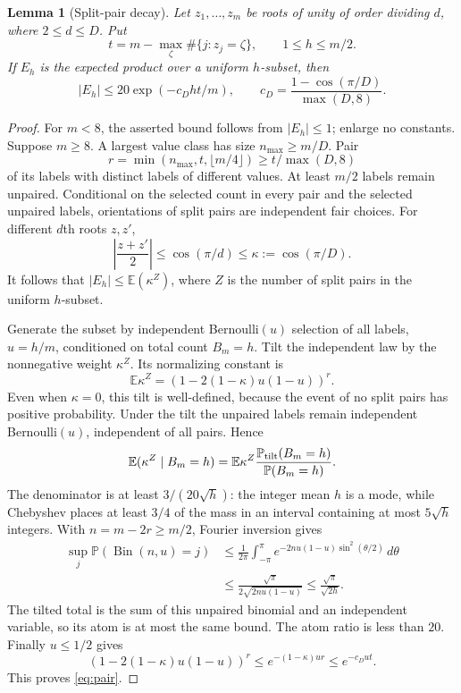 \documentclass[11pt]{article}
\newtheorem{lemma}[theorem]{Lemma}
\theoremstyle{remark}\newtheorem{remark}[theorem]{Remark}
\newcommand{\E}{\mathbb E}
\newcommand{\Pp}{\mathbb P}
\begin{document}
\begin{lemma}[Split-pair decay]\label{lem:pair}
Let $z_1,\ldots,z_m$ be roots of unity of order dividing $d$, where $2\le d\le D$. Put
\[
 t=m-\max_\zeta\#\{j:z_j=\zeta\},\qquad 1\le h\le m/2.
\]
If $E_h$ is the expected product over a uniform $h$-subset, then
\begin{equation}\label{eq:pair}
 |E_h|\le20\exp(-c_Dht/m),\qquad
 c_D=\frac{1-\cos(\pi/D)}{\max(D,8)}.
\end{equation}
\end{lemma}
\begin{proof}
For $m<8$, the asserted bound follows from $|E_h|\le1$; enlarge no constants. Suppose $m\ge8$. A largest value class has size $n_{\max}\ge m/D$. Pair
\[
 r=\min(n_{\max},t,\lfloor m/4\rfloor)\ge t/\max(D,8)
\]
of its labels with distinct labels of different values. At least $m/2$ labels remain unpaired. Conditional on the selected count in every pair and the selected unpaired labels, orientations of split pairs are independent fair choices. For different $d$th roots $z,z'$,
\[
 \left|\frac{z+z'}2\right|\le\cos(\pi/d)\le\kappa:=\cos(\pi/D).
\]
It follows that $|E_h|\le\E(\kappa^Z)$, where $Z$ is the number of split pairs in the uniform $h$-subset.

Generate the subset by independent Bernoulli$(u)$ selection of all labels, $u=h/m$, conditioned on total count $B_m=h$. Tilt the independent law by the nonnegative weight $\kappa^Z$. Its normalizing constant is
\[
 \E\kappa^Z=(1-2(1-\kappa)u(1-u))^r.
\]
Even when $\kappa=0$, this tilt is well-defined, because the event of no split pairs has positive probability. Under the tilt the unpaired labels remain independent Bernoulli$(u)$, independent of all pairs. Hence
\[
 \E(\kappa^Z\mid B_m=h)
 =\E\kappa^Z\frac{\Pp_{\rm tilt}(B_m=h)}{\Pp(B_m=h)}.
\]
The denominator is at least $3/(20\sqrt h)$: the integer mean $h$ is a mode, while Chebyshev places at least $3/4$ of the mass in an interval containing at most $5\sqrt h$ integers. With $n=m-2r\ge m/2$, Fourier inversion gives
\begin{align*}
 \sup_j\Pp(\operatorname{Bin}(n,u)=j)
 &\le\frac1{2\pi}\int_{-\pi}^{\pi}
       e^{-2nu(1-u)\sin^2(\theta/2)}\,d\theta\\
 &\le\frac{\sqrt\pi}{2\sqrt{2nu(1-u)}}
 \le\frac{\sqrt\pi}{\sqrt{2h}}.
\end{align*}
The tilted total is the sum of this unpaired binomial and an independent variable, so its atom is at most the same bound. The atom ratio is less than $20$. Finally $u\le1/2$ gives
\[
 (1-2(1-\kappa)u(1-u))^r
 \le e^{-(1-\kappa)ur}
 \le e^{-c_Dut}.
\]
This proves \eqref{eq:pair}.
\end{proof}
\end{document}
